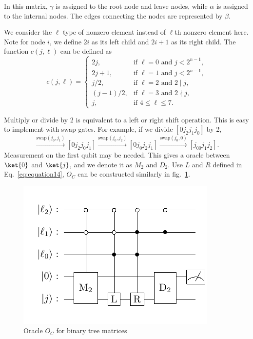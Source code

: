 \documentclass{article}
\begin{document}
In this matrix, $\gamma$ is assigned to the root node and leave nodes, while $\alpha$ is assigned to the internal nodes. The edges connecting the nodes are represented by $\beta$.

We consider the $\ell$ type of nonzero element instead of $\ell$th nonzero element here. Note for node $i$, we define $2i$ as its left child and $2i+1$ as its right child. The function $c(j, \ell)$ can be defined as
\begin{equation}
  c(j, \ell) =
  \begin{cases}
    2j, & \text{if } \ell = 0 \text{ and } j < 2^{n-1},\\
    2j + 1, & \text{if } \ell = 1 \text{ and } j < 2^{n-1},\\
    j/2, & \text{if } \ell = 2 \text{ and } 2 \mid j,\\
    (j-1)/2, & \text{if } \ell = 3 \text{ and } 2 \nmid j,\\
    j, & \text{if } 4 \leq \ell \leq 7.
  \end{cases}\label{eq:equation17}
\end{equation}

Multiply or divide by 2 is equivalent to a left or right shift operation. This is easy to implement with swap gates. For example, if we divide $[0j_2j_1j_0]$ by 2,
\begin{equation}
  [0j_2j_1j_0] \xrightarrow{\text{swap}(j_0,j_1)} [0j_2j_0j_1] \xrightarrow{\text{swap}(j_0,j_2)} [0j_0j_2j_1] \xrightarrow{\text{swap}(j_0,0)} [j_00j_1j_2].
\end{equation}
Measurement on the first qubit may be needed. This gives a oracle between $\ket{0}$ and $\ket{j}$, and we denote it as $M_2$ and $D_2$. Use $L$ and $R$ defined in Eq.~\eqref{eq:equation14}, $O_C$ can be constructed similarly in fig.~\ref{fig:tree_oc}.

\begin{figure}[htbp]
  \centering
  \includegraphics{pdf/tree_oc}
  \caption{Oracle $O_C$ for binary tree matrices}
  \label{fig:tree_oc}
\end{figure}
\end{document}
